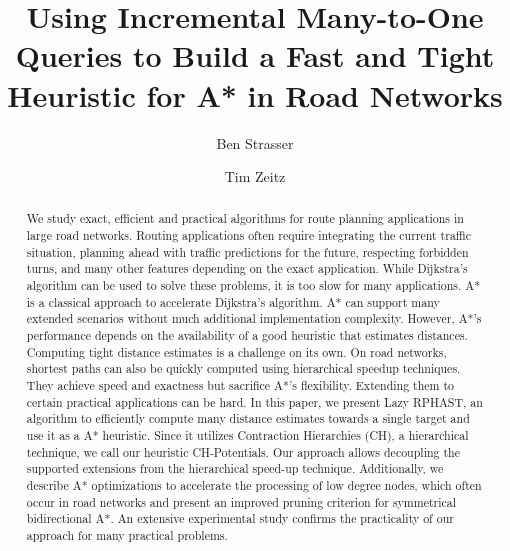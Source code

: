 \documentclass[manuscript,review]{acmart}
\begin{document}

\title{Using Incremental Many-to-One Queries to Build a Fast and Tight Heuristic for A* in Road Networks}

\author{Ben Strasser}
\affiliation{}

\author{Tim Zeitz}


\renewcommand{\shortauthors}{B. Strasser and T. Zeitz}


\begin{abstract}
We study exact, efficient and practical algorithms for route planning applications in large road networks.
Routing applications often require integrating the current traffic situation, planning ahead with traffic predictions for the future, respecting forbidden turns, and many other features depending on the exact application.
While Dijkstra's algorithm can be used to solve these problems, it is too slow for many applications.
A* is a classical approach to accelerate Dijkstra's algorithm.
A* can support many extended scenarios without much additional implementation complexity.
However, A*'s performance depends on the availability of a good heuristic that estimates distances.
Computing tight distance estimates is a challenge on its own.
On road networks, shortest paths can also be quickly computed using hierarchical speedup techniques.
They achieve speed and exactness but sacrifice A*'s flexibility.
Extending them to certain practical applications can be hard.
In this paper, we present Lazy RPHAST, an algorithm to efficiently compute many distance estimates towards a single target and use it as a A* heuristic.
Since it utilizes Contraction Hierarchies (CH), a hierarchical technique, we call our heuristic CH-Potentials.
Our approach allows decoupling the supported extensions from the hierarchical speed-up technique.
Additionally, we describe A* optimizations to accelerate the processing of low degree nodes, which often occur in road networks and present an improved pruning criterion for symmetrical bidirectional A*.
An extensive experimental study confirms the practicality of our approach for many practical problems.
\end{abstract}
\end{document}
